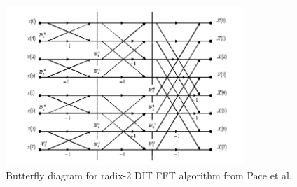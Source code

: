 \documentclass[english,master=eelt,masteroption=ec]{kulemt}
\begin{document}
\begin{figure}[h]
\centering
\includegraphics[width=0.8\textwidth]{img/dit_fft.png}
\caption{Butterfly diagram for radix-2 DIT FFT algorithm from Pace et al. \cite{ditfftimg}}
\label{fig:dit_fft}
\end{figure}

\FloatBarrier
\end{document}
